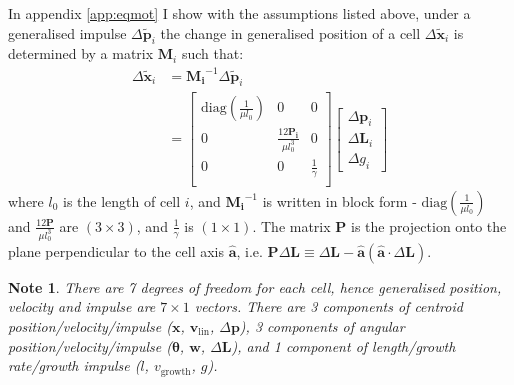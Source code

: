 \documentclass{report}
\let\oldhat\hat
\renewcommand{\vec}[1]{\mathbf{#1}}
\renewcommand{\hat}[1]{\oldhat{\mathbf{#1}}}
\newcommand{\mat}{\mathbf}
\newcommand{\invmat}[1]{\mat{#1}^{-1}}
\newcommand{\deltap}{\Delta \vec{p}}
\newcommand{\deltaL}{\Delta \vec{L}}
\newcommand{\deltag}{\Delta g}
\newtheorem*{note}{Note}
\begin{document}
In appendix \ref{app:eqmot} I show with the assumptions listed above, under a generalised impulse $\Delta
\tilde{\vec{p}}_i$ the change in generalised position of a cell $\Delta
\tilde{\vec{x}}_i$ is
determined by a matrix $\mat{M}_i$ such that:
\begin{align}
\Delta \tilde{\vec{ x}}_i &=
\invmat{M_i} \Delta \tilde{\vec{p}}_i \\
&=
\left[
\begin{array}{ccc}
\textrm{diag}(\frac{1}{\mu l_0}) & 0 & 0 \\
0 & \frac{12\mat{P_i}}{\mu l_0^3} & 0 \\
0 & 0 & \frac{1}{\gamma} \\
\end{array}
\right]
\left[
\begin{array}{l}
\deltap_i \\ \deltaL_i \\ \deltag_i
\end{array}
\right]%
\label{eqn:motion2}
\end{align}
where $l_0$ is the length of cell $i$, and $\invmat{M_i}$ is written in block form - $\textrm{diag}(\frac{1}{\mu l_0})$
and $\frac{12\mat{P}}{\mu l_0^3}$ are $(3\times3)$, and $\frac{1}{\gamma}$ is
$(1\times1)$. The matrix $\mat{P}$ is the projection onto
the plane perpendicular to the cell axis $\hat{\vec{a}}$, i.e. $\mat{P}\deltaL
\equiv \deltaL -
\hat{\vec{a}}(\hat{\vec{a}} \cdot \deltaL)$.

\begin{note}
There are 7 degrees of freedom for each cell, hence generalised position,
velocity and impulse are $7\times1$ vectors. There are 3 components of centroid
position/velocity/impulse ($\vec{x}$, $\vec{v}_\mathrm{lin}$, $\Delta \vec{p}$),
3 components of angular position/velocity/impulse ($\vec{\theta}$, $\vec{w}$,
$\deltaL$), and 1 component of length/growth rate/growth impulse ($l$,
$v_\textrm{growth}$, $g$).
\end{note}
\end{document}

